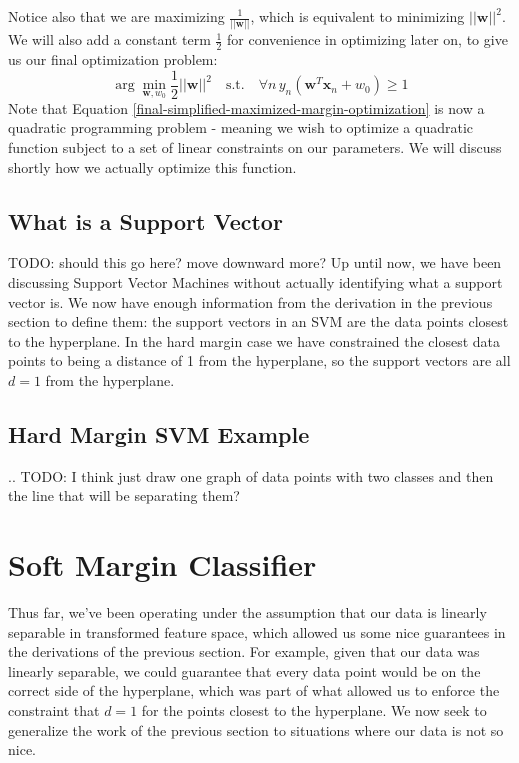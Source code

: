 Notice also that we are maximizing $\frac{1}{||\textbf{w}||}$, which is equivalent to minimizing $||\textbf{w}||^{2}$. We will also add a constant term $\frac{1}{2}$ for convenience in optimizing later on, to give us our final optimization problem:
\begin{equation} \label{final-simplified-maximized-margin-optimization}
	\arg\min_{\textbf{w}, w_{0}} \frac{1}{2} ||\textbf{w}||^{2} \quad \text{s.t.} \quad \forall n \, y_{n}(\textbf{w}^{T}\textbf{x}_{n} + w_{0}) \geq 1
\end{equation}
Note that Equation \ref{final-simplified-maximized-margin-optimization} is now a quadratic programming problem - meaning we wish to optimize a quadratic function subject to a set of linear constraints on our parameters. We will discuss shortly how we actually optimize this function.

\subsection{What is a Support Vector}
TODO: should this go here? move downward more?
Up until now, we have been discussing Support Vector Machines without actually identifying what a support vector is. We now have enough information from the derivation in the previous section to define them: the support vectors in an SVM are the data points closest to the hyperplane. In the hard margin case we have constrained the closest data points to being a distance of 1 from the hyperplane, so the support vectors are all $d=1$ from the hyperplane.


\subsection{Hard Margin SVM Example}
.. TODO: I think just draw one graph of data points with two classes and then the line that will be separating them?

\section{Soft Margin Classifier}
Thus far, we've been operating under the assumption that our data is linearly separable in transformed feature space, which allowed us some nice guarantees in the derivations of the previous section. For example, given that our data was linearly separable, we could guarantee that every data point would be on the correct side of the hyperplane, which was part of what allowed us to enforce the constraint that $d=1$ for the points closest to the hyperplane. We now seek to generalize the work of the previous section to situations where our data is not so nice.

